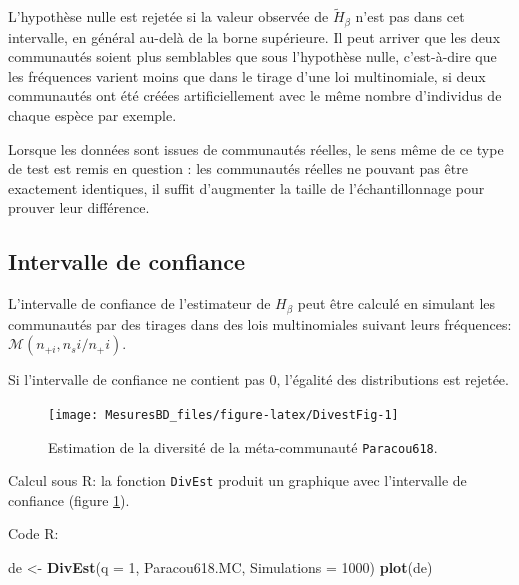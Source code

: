 \documentclass[
  11pt,
  french,
  a4paper,
  extrafontsizes,onecolumn,openright
  ]{memoir}
\newenvironment{Shaded}{\begin{snugshade}}{\end{snugshade}}
\newcommand{\AttributeTok}[1]{\textcolor[rgb]{0.13,0.29,0.53}{#1}}
\newcommand{\DecValTok}[1]{\textcolor[rgb]{0.00,0.00,0.81}{#1}}
\newcommand{\FunctionTok}[1]{\textcolor[rgb]{0.13,0.29,0.53}{\textbf{#1}}}
\newcommand{\NormalTok}[1]{#1}
\newcommand{\OtherTok}[1]{\textcolor[rgb]{0.56,0.35,0.01}{#1}}
\begin{document}
L'hypothèse nulle est rejetée si la valeur observée de \({\tilde{H}}_{\beta}\) n'est pas dans cet intervalle, en général au-delà de la borne supérieure.
Il peut arriver que les deux communautés soient plus semblables que sous l'hypothèse nulle, c'est-à-dire que les fréquences varient moins que dans le tirage d'une loi multinomiale, si deux communautés ont été créées artificiellement avec le même nombre d'individus de chaque espèce par exemple.

Lorsque les données sont issues de communautés réelles, le sens même de ce type de test est remis en question \autocite{Jones1986} : les communautés réelles ne pouvant pas être exactement identiques, il suffit d'augmenter la taille de l'échantillonnage pour prouver leur différence.

\subsection{Intervalle de confiance}\label{intervalle-de-confiance}

L'intervalle de confiance de l'estimateur de \(H_{\beta}\) \autocite{Marcon2014a} peut être calculé en simulant les communautés par des tirages dans des lois multinomiales suivant leurs fréquences: \({\mathcal M}\left(n_{+i},{n_si}/{n_+i}\right)\).

Si l'intervalle de confiance ne contient pas 0, l'égalité des distributions est rejetée.



\scriptsize

\begin{figure}

{\centering \texttt{[image: MesuresBD\_files/figure-latex/DivestFig-1]} 

}

\caption{Estimation de la diversité de la méta-communauté \texttt{Paracou618}.}\label{fig:DivestFig}
\end{figure}

\normalsize

Calcul sous R: la fonction \texttt{DivEst} produit un graphique avec l'intervalle de confiance (figure \ref{fig:DivestFig}).

Code R:

\scriptsize

\begin{Shaded}
\begin{Highlighting}[]
\NormalTok{de }\OtherTok{\textless{}{-}} \FunctionTok{DivEst}\NormalTok{(}\AttributeTok{q =} \DecValTok{1}\NormalTok{, Paracou618.MC, }\AttributeTok{Simulations =} \DecValTok{1000}\NormalTok{)}
\FunctionTok{plot}\NormalTok{(de)}
\end{Highlighting}
\end{Shaded}
\end{document}
